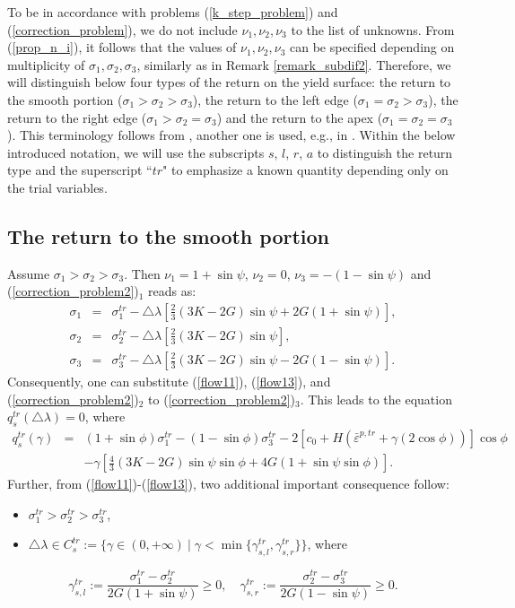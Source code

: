 \documentclass[a4paper,12pt]{article}
\theoremstyle{remark}
\numberwithin{equation}{section}
\begin{document}
To be in accordance with problems (\ref{k_step_problem}) and (\ref{correction_problem}), we do not include $\nu_1,\nu_2,\nu_3$ to the list of unknowns. From (\ref{prop_n_i}), it follows that
the values of $\nu_1,\nu_2,\nu_3$ can be specified depending on multiplicity of $\sigma_1,\sigma_2,\sigma_3$, similarly as in Remark \ref{remark_subdif2}. Therefore, we will distinguish below four types of the return on the yield surface: the return to the smooth portion ($\sigma_1>\sigma_2>\sigma_3$), the return to the left edge ($\sigma_1=\sigma_2>\sigma_3$), the return to the right edge ($\sigma_1>\sigma_2=\sigma_3$) and the return to the apex ($\sigma_1=\sigma_2=\sigma_3$). This terminology follows from \cite{NPO08}, another one is used, e.g., in \cite{LR96}. Within the below introduced notation, we will use the subscripts $s$, $l$, $r$, $a$ to distinguish the return type and the superscript ``$tr$" to emphasize a known quantity depending only on the trial variables.

\subsection{The return to the smooth portion}
\label{subsec_smooth}

Assume $\sigma_1>\sigma_2>\sigma_3$. Then $\nu_1=1+\sin\psi$, $\nu_2=0$, $\nu_3=-(1-\sin\psi)$ and (\ref{correction_problem2})$_1$ reads as:
\begin{eqnarray}
\sigma_1&=&\sigma_1^{tr}-\triangle\lambda\left[\frac{2}{3}(3K-2G)\sin\psi+2G(1+\sin\psi)\right],\label{flow11}\\
\sigma_2&=&\sigma_2^{tr}-\triangle\lambda\left[\frac{2}{3}(3K-2G)\sin\psi\right],\label{flow12}\\
\sigma_3&=&\sigma_3^{tr}-\triangle\lambda\left[\frac{2}{3}(3K-2G)\sin\psi-2G(1-\sin\psi)\right].\label{flow13}
\end{eqnarray}
Consequently, one can substitute (\ref{flow11}), (\ref{flow13}), and (\ref{correction_problem2})$_2$ to (\ref{correction_problem2})$_3$. This leads to the equation $q_s^{tr}(\triangle\lambda)=0$, where 
\begin{eqnarray}
q^{tr}_s(\gamma)&=&(1+\sin\phi)\sigma_1^{tr}-(1-\sin\phi)\sigma_3^{tr}-2\left[c_0+H\left(\bar{\varepsilon}^{p,tr}+\gamma (2\cos\phi)\right)\right]\cos\phi\nonumber\\
&&-\gamma\left[\frac{4}{3}(3K-2G)\sin\psi\sin\phi+ 4G(1+\sin\psi\sin\phi)\right]. \label{q1}
\end{eqnarray}
Further, from (\ref{flow11})-(\ref{flow13}), two additional important consequence follow:
\begin{itemize}
\item $\sigma_1^{tr}>\sigma_2^{tr}>\sigma_3^{tr}$,
\item $\triangle\lambda\in C^{tr}_s:=\{\gamma\in(0,+\infty)\ |\; \gamma<\min\{\gamma^{tr}_{s,l},\gamma^{tr}_{s,r}\}\}$, where
\end{itemize}
\begin{equation}
\gamma^{tr}_{s,l}:=\frac{\sigma_1^{tr}-\sigma_2^{tr}}{2G(1+\sin\psi)}\geq0,\quad\gamma^{tr}_{s,r}:=\frac{\sigma_2^{tr}-\sigma_3^{tr}}{2G(1-\sin\psi)}\geq0.
\label{gamma1}
\end{equation}
\end{document}
